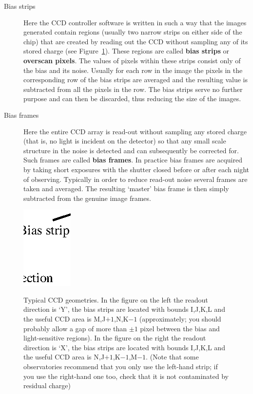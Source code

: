 \documentclass[twoside,11pt]{article}
\begin{document}
\begin{description}

  \item[Bias strips] Here the CCD controller software is written in such
   a way that the images generated contain regions (usually two narrow
   strips on either side of the chip) that are created by reading out the
   CCD without sampling any of its stored charge (see
   Figure~\ref{BIAS_STRIPS}). These regions are called {\bf bias strips}
   or {\bf overscan pixels}.  The values of pixels within these strips
   consist only of the bias and its noise.  Usually for each row in the
   image the pixels in the corresponding row of the bias strips are
   averaged and the resulting value is subtracted from all the pixels in
   the row.  The bias strips serve no further purpose and can then be
   discarded, thus reducing the size of the images.

  \item[Bias frames] Here the entire CCD array is read-out without sampling
   any stored charge (that is, no light is incident on the detector) so
   that any small scale structure in the noise is detected and can
   subsequently be corrected for.  Such frames are called {\bf bias frames}.
   In practice bias frames are acquired by taking short exposures with
   the shutter closed before or after each night of observing.  Typically
   in order to reduce read-out noise several frames are taken and averaged.
   The resulting `master' bias frame is then simply subtracted from the
   genuine image frames.

\end{description}

\begin{figure}[htbp]
   \centering
   \includegraphics[totalheight=3.5in]{sc5_biasstrips.ps}
   \begin{quote}
   \caption[Typical CCD geometries]{Typical CCD geometries.
    In the figure on the left the readout direction is `Y', the bias
    strips are located with bounds I,J,K,L and the useful CCD area is
    M,J$+1$,N,K$-1$ (approximately; you should probably allow a gap of
    more than $\pm 1$ pixel between the bias and light-sensitive regions).
    In the figure on the right the readout direction is `X', the bias
    strips are located with bounds I,J,K,L and the useful CCD area is
    N,J$+1$,K$-1$,M$-1$. (Note that some observatories recommend that you
    only use the left-hand strip; if you use the right-hand one too, check
    that it is not contaminated by residual charge)
   \label{BIAS_STRIPS} }
   \end{quote}
\end{figure}
\end{document}
